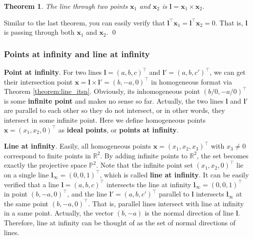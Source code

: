 \documentclass[12pt]{article}
\newtheorem{theorem}{Theorem}[section]
\numberwithin{equation}{section}
\renewenvironment{proof}{{\bfseries Proof.}}{\qed \\}
\begin{document}
\begin{theorem}
The line through two points $\mathbf{x}_1$ and $\mathbf{x}_2$ is $\mathbf{l} = \mathbf{x}_1 \times \mathbf{x}_2$.
\label{theorem:point_itsn}
\end{theorem}

\begin{proof}
Similar to the last theorem, you can easily verify that $\mathbf{l}^\top  \mathbf{x}_1 = \mathbf{l}^\top  \mathbf{x}_2 = 0$. That is, $\mathbf{l}$ is passing through both $\mathbf{x}_1$ and $\mathbf{x}_2$.
\end{proof}

\subsubsection{Points at infinity and line at infinity}
\label{sec:point_line_infinity}

\textbf{Point at infinity}. For two lines $\mathbf{l} = (a, b, c)^\top$ and $\mathbf{l}' = (a, b, c')^\top$, we can get their intersection point $\mathbf{x} = \mathbf{l} \times \mathbf{l}' = (b, -a, 0)^\top$ in homogeneous format via Theorem \ref{theorem:line_itsn}. Obviously, its inhomogeneous point $(b/0, -a/0)^\top$ is some \textbf{infinite point} and makes no sense so far. Actually, the two lines $\mathbf{l}$ and $\mathbf{l}'$ are parallel to each other so they do not intersect, or in other words, they intersect in some infinite point. Here we define homogeneous points $\mathbf{x} = (x_1, x_2, 0)^\top$ as \textbf{ideal points}, or \textbf{points at infinity}.

\textbf{Line at infinity}. Easily, all homogeneous points $\mathbf{x} = (x_1, x_2, x_3)^\top$ with $x_3 \neq 0$ correspond to finite points in $\mathbb{R}^2$. By adding infinite points to $\mathbb{R}^2$, the set becomes exactly the projective space $\mathbb{P}^2$. Note that the infinite point set $(x_1, x_2, 0)^\top$ lie on a single line $\mathbf{l}_{\infty} = (0, 0, 1)^\top$, which is called \textbf{line at infinity}. It can be easily verified that a line $\mathbf{l} = (a, b, c)^\top$ intersects the line at infinity $\mathbf{l}_{\infty} = (0, 0, 1)^\top$ in point $(b, -a, 0)^\top$, and the line $\mathbf{l}' = (a, b, c')^\top$ parallel to $\mathbf{l}$ intersects $\mathbf{l}_{\infty}$ at the same point $(b, -a, 0)^\top$. That is, parallel lines intersect with line at infinity in a same point. Actually, the vector $(b, -a)$ is the normal direction of line $\mathbf{l}$. Therefore, line at infinity can be thought of as the set of normal directions of lines.
\end{document}
